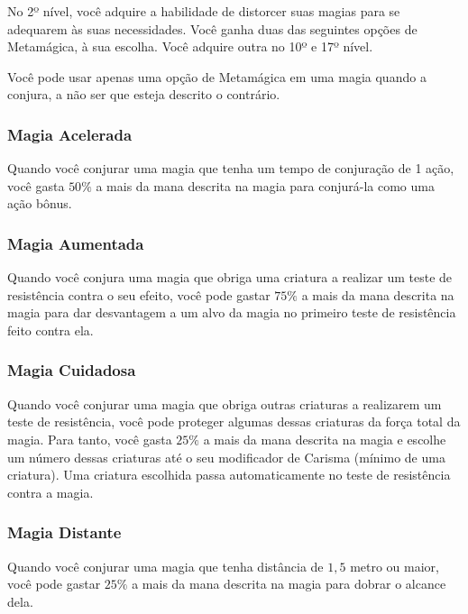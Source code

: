 \documentclass{RPG_Adventure}[2021/10/20]
\begin{document}
No 2º nível, você adquire a habilidade de distorcer suas magias para se
adequarem às suas necessidades. Você ganha duas das seguintes opções de
Metamágica, à sua escolha. Você adquire outra no 10º e 17º nível.

Você pode usar apenas uma opção de Metamágica em uma magia quando a conjura, a
não ser que esteja descrito o contrário.

\subsubsection*{Magia Acelerada}%
\label{ssub:magia_acelerada}

Quando você conjurar uma magia que tenha um tempo de conjuração de 1 ação, você
gasta $50\%$ a mais da mana descrita na magia para conjurá-la como uma ação
bônus.

\subsubsection*{Magia Aumentada}%
\label{ssub:magia_aumentada}

Quando você conjura uma magia que obriga uma criatura a realizar um teste de
resistência contra o seu efeito, você pode gastar $75\%$ a mais da mana descrita
na magia para dar desvantagem a um alvo da magia no primeiro teste de
resistência feito contra ela.

\subsubsection*{Magia Cuidadosa}%
\label{ssub:magia_cuidadosa}

Quando você conjurar uma magia que obriga outras criaturas a realizarem um teste
de resistência, você pode proteger algumas dessas criaturas da força total da
magia. Para tanto, você gasta $25\%$ a mais da mana descrita na magia e escolhe
um número dessas criaturas até o seu modificador de Carisma (mínimo de uma
criatura). Uma criatura escolhida passa automaticamente no teste de resistência
contra a magia.

\subsubsection*{Magia Distante}%
\label{ssub:magia_distante}

Quando você conjurar uma magia que tenha distância de $1,5$ metro ou maior, você
pode gastar $25\%$ a mais da mana descrita na magia para dobrar o alcance dela.
\end{document}
